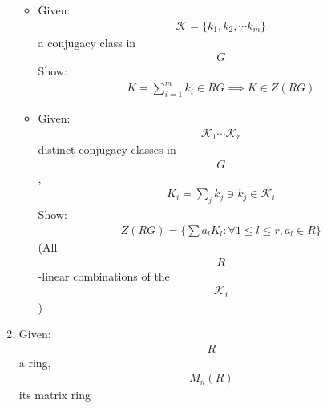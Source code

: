 \begin{enumerate}
  \begin{itemize}
  \tightlist
  \item
    Given: \begin{align*}
    \mathcal{K} = \{ k_1, k_2, \cdots k_m\}\end{align*}
     a conjugacy class in \begin{align*}
    G\end{align*}
     Show: \begin{align*}
    K = \sum_{i=1}^m k_i \in RG \implies K \in Z(RG)\end{align*}
  \item
    Given: \begin{align*}
    \mathcal{K}_1\cdots \mathcal{K}_r\end{align*}
     distinct conjugacy classes in \begin{align*}
    G\end{align*}
    , \begin{align*}
    K_i = \sum_{j}k_j \ni k_j \in \mathcal{K}_i\end{align*}
     Show: \begin{align*}
    Z(RG) = \{\sum a_l K_l : \forall 1 \leq l \leq r, a_l \in R \}\end{align*}
     (All \begin{align*}
    R\end{align*}
    -linear combinations of the \begin{align*}
    \mathcal{K}_i\end{align*}
    )
  \end{itemize}
\item
  Given: \begin{align*}
  R\end{align*}
   a ring, \begin{align*}
  M_n(R)\end{align*}
   its matrix ring


\end{enumerate}
